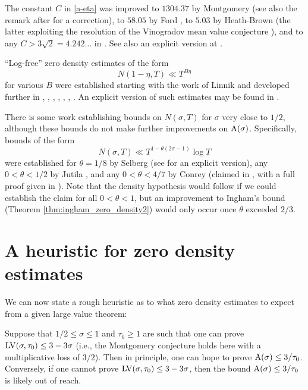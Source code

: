 The constant $C$ in \eqref{a-eta} was improved to $1304.37$ by Montgomery \cite[Theorem 12.3]{montgomery_topics_1971} (see also the remark after \cite[(11.97)]{ivic} for a correction), to $58.05$ by Ford \cite{FordZeta}, to $5.03$ by Heath-Brown \cite{heathbrown_new_2017} (the latter exploiting the resolution of the Vinogradov mean value conjecture \cite{bourgain_demeter_guth}), and to any $C > 3\sqrt{2}=4.242\dots$ in \cite{pintz_density_2023}. See also an explicit version at \cite{bellotti}.

``Log-free'' zero density estimates of the form
$$ N(1-\eta,T) \ll T^{B\eta}$$
for various $B$ were established starting with the work of Linnik \cite{linnik-1,linnik-2} and developed further in \cite{turan}, \cite{fogels}, \cite{bombieri_1974}, \cite{jutila_linnik}, \cite{gallagher_large_sieve}, \cite{graham_1978}, \cite{heath_brown_least_prime}. An explicit version of such estimates may be found in \cite{bellotti_2024}.

There is some work establishing bounds on $N(\sigma,T)$ for $\sigma$ very close to $1/2$, although these bounds do not make further improvements on $\mathrm{A}(\sigma)$.  Specifically, bounds of the form
$$ N(\sigma,T) \ll T^{1-\theta(2\sigma-1)} \log T$$
were established for $\theta=1/8$ by Selberg \cite{selberg_1946} (see \cite{simonic} for an explicit version), any $0 < \theta < 1/2$ by Jutila \cite{jutila-critical}, and any $0 < \theta < 4/7$ by Conrey (claimed in \cite{conrey_at_1989}, with a full proof given in \cite{baluyot_thesis}).  Note that the density hypothesis would follow if we could establish the claim for all $0 < \theta < 1$, but an improvement to Ingham's bound (Theorem \ref{thm:ingham_zero_density2}) would only occur once $\theta$ exceeded $2/3$.

\section{A heuristic for zero density estimates}

We can now state a rough heuristic as to what zero density estimates to expect from a given large value theorem:

\begin{heuristic}\label{lv-heuristic} Suppose that $1/2 \leq \sigma \leq 1$ and $\tau_0 \geq 1$ are such that one can prove $\mathrm{LV}(\sigma, \tau_0) \leq 3-3\sigma$ (i.e., the Montgomery conjecture holds here with a multiplicative loss of $3/2$).  Then in principle, one can hope to prove $\mathrm{A}(\sigma) \leq 3/\tau_0$.  Conversely, if one cannot prove $\mathrm{LV}(\sigma, \tau_0) \leq 3-3\sigma$, then the bound $\mathrm{A}(\sigma) \leq 3/\tau_0$ is likely out of reach.
\end{heuristic}

